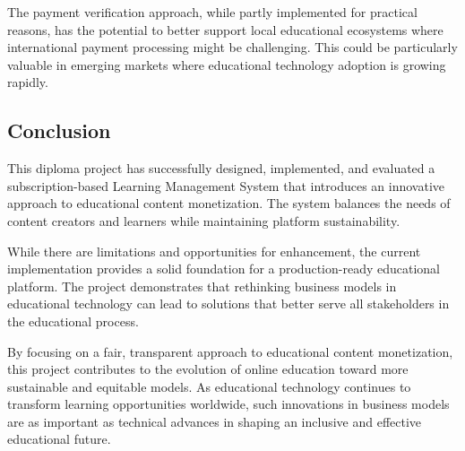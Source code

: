 The payment verification approach, while partly implemented for practical reasons, has the potential to better support local educational ecosystems where international payment processing might be challenging. This could be particularly valuable in emerging markets where educational technology adoption is growing rapidly.

\subsection{Conclusion}

This diploma project has successfully designed, implemented, and evaluated a subscription-based Learning Management System that introduces an innovative approach to educational content monetization. The system balances the needs of content creators and learners while maintaining platform sustainability.

While there are limitations and opportunities for enhancement, the current implementation provides a solid foundation for a production-ready educational platform. The project demonstrates that rethinking business models in educational technology can lead to solutions that better serve all stakeholders in the educational process.

By focusing on a fair, transparent approach to educational content monetization, this project contributes to the evolution of online education toward more sustainable and equitable models. As educational technology continues to transform learning opportunities worldwide, such innovations in business models are as important as technical advances in shaping an inclusive and effective educational future.